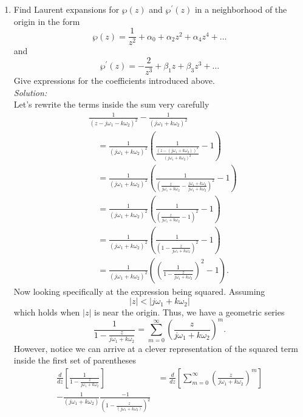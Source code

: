 \documentclass[10pt]{amsart}
\theoremstyle{nonumberplain}
\begin{document}
\begin{enumerate}[label={\bf {\arabic*}:}]
\begin{enumerate}
\item Find Laurent expansions for $\wp(z)$ and $\wp^{\prime}(z)$ in a neighborhood of the origin in the form
$$ \wp(z)=\frac{1}{z^2}+\alpha_0+\alpha_2 z^2+\alpha_4 z^4+\ldots $$
and
$$ \wp^{\prime}(z)=-\frac{2}{z^3}+\beta_1 z+\beta_3 z^3+\ldots $$
Give expressions for the coefficients introduced above. \\

\noindent
\textit{Solution:} \\
Let's rewrite the terms inside the sum very carefully
\begin{align*}
& \frac 1 {\left(z-j \omega_1-k \omega_2\right)^2}-\frac{1}{\left(j \omega_1+k \omega_2\right)^2} \\
	&\quad= \frac{1}{\left(j \omega_1+k \omega_2\right)^2}
		\left(
			\frac 1 { \frac{\left(z - (j \omega_1 + k \omega_2) \right)^2}{\left(j \omega_1+k \omega_2\right)^2}} - 1
		\right) \\
	&\quad= \frac{1}{\left(j \omega_1+k \omega_2\right)^2}
		\left(
			\frac 1 { \left(\frac z {j \omega_1 + k \omega_2} 
			- \frac {j \omega_1 + k \omega_2}{j \omega_1 + k \omega_2} \right)^2} - 1
		\right) \\
	&\quad= \frac{1}{\left(j \omega_1+k \omega_2\right)^2}
		\left( \frac 1 { \left(\frac z {j \omega_1 + k \omega_2} - 1 \right)^2} - 1\right) \\
	&\quad= \frac{1}{\left(j \omega_1+k \omega_2\right)^2}
		\left( \frac 1 { \left(1 -  \frac z {j \omega_1 + k \omega_2} \right)^2} - 1 \right) \\
	&\quad= \frac{1}{\left(j \omega_1+k \omega_2\right)^2}
		\left( \left(  \frac 1 { 1 -  \frac z {j \omega_1 + k \omega_2} }\right)^2 - 1 \right) .
\end{align*}
Now looking specifically at the expression being squared.
Assuming
$$|z| < |j \omega_1 + k \omega_2|$$ 
which holds when $|z|$ is near the origin.
Thus, we have a geometric series
$$
\frac 1 { 1 -  \frac z {j \omega_1 + k \omega_2} } = \sum_{m=0}^{\infty} \left( \frac z {j \omega_1 + k \omega_2} \right)^m.
$$
However, notice we can arrive at a clever representation of the squared term inside the first set of parentheses 
\begin{align*}
\frac d {dz} \left[ \frac 1 { 1 -  \frac z {j \omega_1 + k \omega_2} } \right]
	&= \frac d {dz} \left[ \sum_{m=0}^{\infty} \left( \frac z {j \omega_1 + k \omega_2} \right)^m \right] \\
- \frac 1 {(j \omega_1 + k \omega_2)} \frac {-1} {\left(1 -  \frac z {(j \omega_1 + k \omega_2)} \right)^2}

\end{align*}
\end{enumerate}
\end{enumerate}
\end{document}
